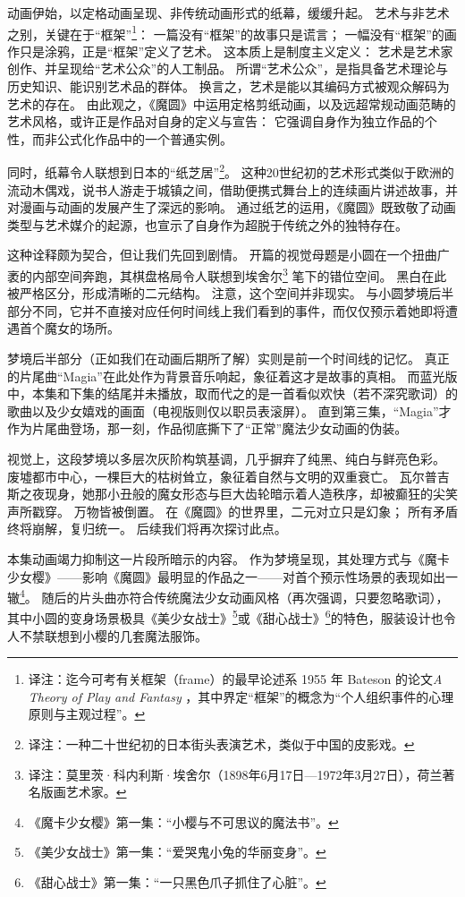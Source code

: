 动画伊始，以定格动画呈现、非传统动画形式的纸幕，缓缓升起。
艺术与非艺术之别，关键在于“框架”\footnote{%
    译注：迄今可考有关框架（frame）的最早论述系 1955 年 Bateson 的论文\emph{A Theory of Play and Fantasy} ，其中界定“框架”的概念为“个人组织事件的心理原则与主观过程”。
}：
一篇没有“框架”的故事只是谎言；
一幅没有“框架”的画作只是涂鸦，正是“框架”定义了艺术。
这本质上是制度主义定义：
艺术是艺术家创作、并呈现给“艺术公众”的人工制品。
所谓“艺术公众”，是指具备艺术理论与历史知识、能识别艺术品的群体\cite{ref9}。
换言之，艺术是能以其编码方式被观众解码为艺术的存在。
由此观之，《魔圆》中运用定格剪纸动画，以及远超常规动画范畴的艺术风格，或许正是作品对自身的定义与宣告：
它强调自身作为独立作品的个性，而非公式化作品中的一个普通实例。

同时，纸幕令人联想到日本的“纸芝居”\footnote{%
    译注：一种二十世纪初的日本街头表演艺术，类似于中国的皮影戏。
}。
这种20世纪初的艺术形式类似于欧洲的流动木偶戏，说书人游走于城镇之间，借助便携式舞台上的连续画片讲述故事\cite{ref10}，并对漫画与动画的发展产生了深远的影响\cite{ref10}。
通过纸艺的运用，《魔圆》既致敬了动画类型与艺术媒介的起源，也宣示了自身作为超脱于传统之外的独特存在。

这种诠释颇为契合，但让我们先回到剧情。
开篇的视觉母题是小圆在一个扭曲广袤的内部空间奔跑，其棋盘格局令人联想到埃舍尔\footnote{%
    译注：莫里茨·科内利斯·埃舍尔（1898年6月17日—1972年3月27日），荷兰著名版画艺术家。
} 笔下的错位空间。
黑白在此被严格区分，形成清晰的二元结构。
注意，这个空间并非现实。
与小圆梦境后半部分不同，它并不直接对应任何时间线上我们看到的事件，而仅仅预示着她即将遭遇首个魔女的场所。

梦境后半部分（正如我们在动画后期所了解）实则是前一个时间线的记忆。
真正的片尾曲“Magia”在此处作为背景音乐响起，象征着这才是故事的真相。
而蓝光版中，本集和下集的结尾并未播放，取而代之的是一首看似欢快（若不深究歌词）的歌曲以及少女嬉戏的画面（电视版则仅以职员表滚屏）。
直到第三集，“Magia”才作为片尾曲登场，那一刻，作品彻底撕下了“正常”魔法少女动画的伪装。

视觉上，这段梦境以多层次灰阶构筑基调，几乎摒弃了纯黑、纯白与鲜亮色彩。
废墟都市中心，一棵巨大的枯树耸立，象征着自然与文明的双重衰亡。
瓦尔普吉斯之夜现身，她那小丑般的魔女形态与巨大齿轮暗示着人造秩序，却被癫狂的尖笑声所戳穿。
万物皆被倒置。
在《魔圆》的世界里，二元对立只是幻象；
所有矛盾终将崩解，复归统一。
后续我们将再次探讨此点。

本集动画竭力抑制这一片段所暗示的内容。
作为梦境呈现，其处理方式与《魔卡少女樱》——影响《魔圆》最明显的作品之一——对首个预示性场景的表现如出一辙\footnote{%
    《魔卡少女樱》第一集：“小樱与不可思议的魔法书”。
}\cite{ref11}。
随后的片头曲亦符合传统魔法少女动画风格（再次强调，只要忽略歌词），其中小圆的变身场景极具《美少女战士》\footnote{%
    《美少女战士》第一集：“爱哭鬼小兔的华丽变身”。
}\cite{ref12}或《甜心战士》\footnote{%
    《甜心战士》第一集：“一只黑色爪子抓住了心脏”。
}\cite{ref13}的特色，服装设计也令人不禁联想到小樱的几套魔法服饰。

